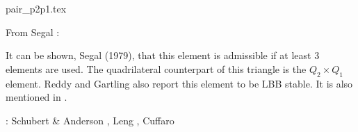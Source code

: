 \begin{flushright} {\tiny {\color{gray} pair\_p2p1.tex}} \end{flushright}

\noindent
\begin{minipage}{0.54\textwidth}
From Segal \cite{segal}: 

It can be shown, Segal (1979), that this element is admissible if at least 3 elements 
are used. The quadrilateral counterpart of this triangle is the $Q_2\times Q_1$ element.
Reddy and Gartling \cite[p179]{reddybook2} also report this element to be LBB stable.
It is also mentioned in \textcite{nath93}.

\Literature: Schubert \& Anderson \cite{scan85}, Leng \etal \cite{lejx14}, Cuffaro \etal \cite{cump20}
\end{minipage}
\hfill
\begin{minipage}{0.42\textwidth}
\begin{center}

\end{center}
\end{minipage}




